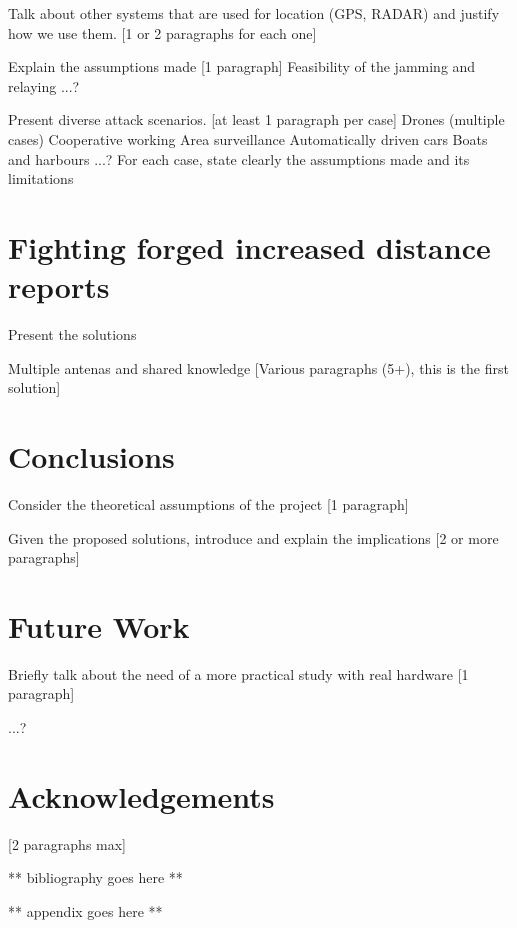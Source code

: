 \documentclass{article}
\begin{document}
Talk about other systems that are used for location (GPS, RADAR) and justify how we use them. [1 or 2 paragraphs for each one]

Explain the assumptions made [1 paragraph]
   Feasibility of the jamming and relaying
   ...?
   
Present diverse attack scenarios. [at least 1 paragraph per case]
   Drones (multiple cases)
     Cooperative working
     Area surveillance
   Automatically driven cars
   Boats and harbours
  ...?
For each case, state clearly the assumptions made and its limitations


\section{Fighting forged increased distance reports}

Present the solutions

Multiple antenas and shared knowledge [Various paragraphs (5+), this is the first solution]

\section{Conclusions}

Consider the theoretical assumptions of the project [1 paragraph]

Given the proposed solutions, introduce and explain the implications [2 or more paragraphs]

\section{Future Work}

Briefly talk about the need of a more practical study with real hardware [1 paragraph]

...?

\section{Acknowledgements}

[2 paragraphs max]

\printbibliography

** bibliography goes here **

** appendix goes here **

\end{document}

